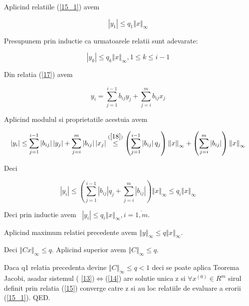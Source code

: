 \documentclass[a4paper,twoside]{book}
\begin{document}
Aplicind relatiile (\ref{15_1}) avem

\begin{equation*}
\left\vert y_{1}\right\vert \leq q_{1}\left\Vert x\right\Vert _{\infty }
\end{equation*}

Presupunem prin inductie ca urmatoarele relatii sunt adevarate:

\begin{equation}
\left\vert y_{k}\right\vert \leq q_{k}\left\Vert x\right\Vert _{\infty
},1\leq k\leq i-1  \label{18}
\end{equation}

Din relatia (\ref{17}) avem

\begin{equation*}
y_{i}=\sum_{j=1}^{i-1}b_{ij}y_{j}+\sum_{j=i}^{m}b_{ij}x_{j}
\end{equation*}

Aplicind modulul si proprietatile acestuia avem

\begin{equation*}
\left\vert y_{i}\right\vert \leq \sum_{j=1}^{i-1}\left\vert
b_{ij}\right\vert \left\vert y_{j}\right\vert +\sum_{j=i}^{m}\left\vert
b_{ij}\right\vert \left\vert x_{j}\right\vert \overset{(\ref{18})}{\leq }%
\left( \sum_{j=1}^{i-1}\left\vert b_{ij}\right\vert q_{j}\right) \left\Vert
x\right\Vert _{\infty }+\left( \sum_{j=i}^{m}\left\vert b_{ij}\right\vert
\right) \left\Vert x\right\Vert _{\infty }
\end{equation*}

Deci

\begin{equation*}
\left\vert y_{i}\right\vert \leq \left( \sum_{j=1}^{i-1}\left\vert
b_{ij}\right\vert q_{j}+\sum_{j=i}^{m}\left\vert b_{ij}\right\vert \right)
\left\Vert x\right\Vert _{\infty }\leq q_{i}\left\Vert x\right\Vert _{\infty
}
\end{equation*}

Deci prin inductie avem \ $\left\vert y_{i}\right\vert \leq q_{i}\left\Vert
x\right\Vert _{\infty },i=\overline{1,m}$.

Aplicind maximum relatiei precedente avem $\left\Vert y\right\Vert _{\infty
}\leq q\left\Vert x\right\Vert _{\infty }$.

Deci $\left\Vert Cx\right\Vert _{\infty }\leq q$. Aplicind superior avem $%
\left\Vert C\right\Vert _{\infty }\leq q$.

Daca q\TEXTsymbol{<}1 relatia precedenta devine $\left\Vert C\right\Vert
_{\infty }\leq q<1$ deci se poate aplica Teorema Jacobi, asadar sistemul (%
\ref{13})$\Leftrightarrow $(\ref{14}) are solutie unica z si $\forall
x^{(0)}\in R^{m}$ sirul definit prin relatia (\ref{15}) converge catre z si
au loc relatiile de evaluare a erorii (\ref{15_1}). QED.
\end{document}

